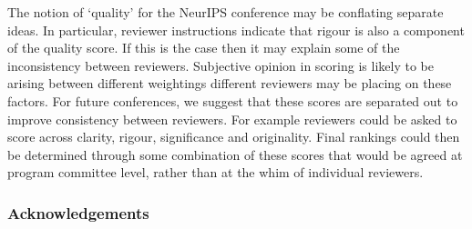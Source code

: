 \documentclass[twoside]{article}
\begin{document}
The notion of `quality' for the NeurIPS conference may be conflating
separate ideas. In particular, reviewer instructions indicate that
rigour is also a component of the quality score. If this is the case
then it may explain some of the inconsistency between
reviewers. Subjective opinion in scoring is likely to be arising
between different weightings different reviewers may be placing on
these factors. For future conferences, we suggest that these scores
are separated out to improve consistency between reviewers. For
example reviewers could be asked to score across clarity, rigour,
significance and originality. Final rankings could then be determined
through some combination of these scores that would be agreed at
program committee level, rather than at the whim of individual
reviewers.

\subsubsection*{Acknowledgements}

\newpage


\newpage
\onecolumn
\appendix

\end{document}
